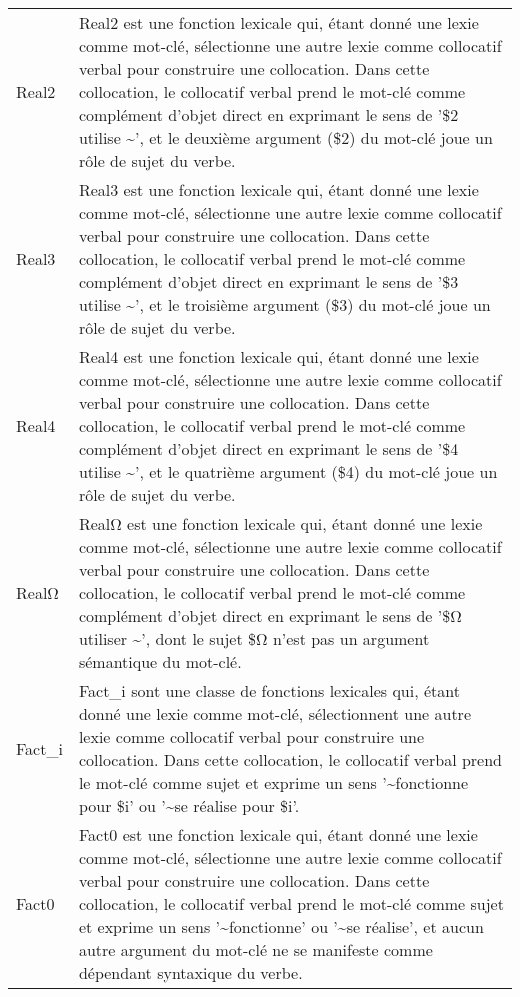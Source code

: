\begin{longtable}{ll}
Real2 & Real2 est une fonction lexicale qui, étant donné une lexie comme mot-clé, sélectionne une autre lexie comme collocatif verbal pour construire une collocation. Dans cette collocation, le collocatif verbal prend le mot-clé comme complément d'objet direct en exprimant le sens de '\$2 utilise \textasciitilde ', et le deuxième argument (\$2) du mot-clé joue un rôle de sujet du verbe. \\
Real3 & Real3 est une fonction lexicale qui, étant donné une lexie comme mot-clé, sélectionne une autre lexie comme collocatif verbal pour construire une collocation. Dans cette collocation, le collocatif verbal prend le mot-clé comme complément d'objet direct en exprimant le sens de '\$3 utilise \textasciitilde ', et le troisième argument (\$3) du mot-clé joue un rôle de sujet du verbe. \\
Real4 & Real4 est une fonction lexicale qui, étant donné une lexie comme mot-clé, sélectionne une autre lexie comme collocatif verbal pour construire une collocation. Dans cette collocation, le collocatif verbal prend le mot-clé comme complément d'objet direct en exprimant le sens de '\$4 utilise \textasciitilde ', et le quatrième argument (\$4) du mot-clé joue un rôle de sujet du verbe. \\
RealΩ & RealΩ est une fonction lexicale qui, étant donné une lexie comme mot-clé, sélectionne une autre lexie comme collocatif verbal pour construire une collocation. Dans cette collocation, le collocatif verbal prend le mot-clé comme complément d'objet direct en exprimant le sens de '\$Ω utiliser \textasciitilde ', dont le sujet \$Ω n'est pas un argument sémantique du mot-clé. \\
Fact\_i & Fact\_i sont une classe de fonctions lexicales qui, étant donné une lexie comme mot-clé, sélectionnent une autre lexie comme collocatif verbal pour construire une collocation. Dans cette collocation, le collocatif verbal prend le mot-clé comme sujet et exprime un sens '\textasciitilde \space fonctionne pour \$i' ou '\textasciitilde \space se réalise pour \$i'. \\
Fact0 & Fact0 est une fonction lexicale qui, étant donné une lexie comme mot-clé, sélectionne une autre lexie comme collocatif verbal pour construire une collocation. Dans cette collocation, le collocatif verbal prend le mot-clé comme sujet et exprime un sens '\textasciitilde \space fonctionne' ou '\textasciitilde \space se réalise', et aucun autre argument du mot-clé ne se manifeste comme dépendant syntaxique du verbe. \\

\end{longtable}
